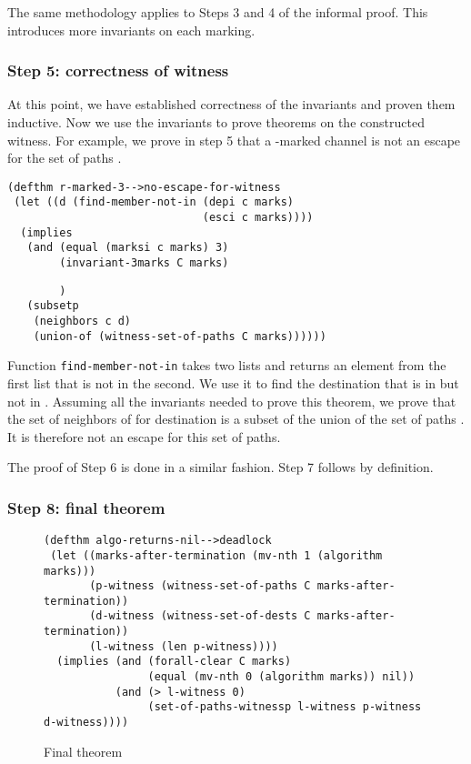 \documentclass[submission,copyright]{eptcs}
\begin{document}
The same methodology applies to Steps 3 and 4 of the informal proof. This introduces more invariants on each marking.

\subsubsection{Step 5: correctness of witness}
At this point, we have established correctness of the invariants and proven them inductive. Now we use the invariants to prove theorems on the constructed witness. For example, we prove in step 5 that a -marked channel is not an escape for the set of paths .
\begin{verbatim}
(defthm r-marked-3-->no-escape-for-witness
 (let ((d (find-member-not-in (depi c marks)
                              (esci c marks))))
  (implies
   (and (equal (marksi c marks) 3)
        (invariant-3marks C marks)
\end{verbatim}
\vspace{-1em}\hspace{10ex}\hspace{2ex}{\tt invariants}
\vspace{-1em}
\begin{verbatim}
        )
   (subsetp
    (neighbors c d)  
    (union-of (witness-set-of-paths C marks))))))
\end{verbatim}
Function {\tt find-member-not-in} takes two lists and returns an element from the first list that is not in the second. We use it to find the destination  that is in  but not in . Assuming all the invariants needed to prove this theorem, we prove that the set of neighbors of  for destination  is a subset of the union of the set of paths .
It is therefore not an escape for this set of paths.

The proof of Step 6 is done in a similar fashion. Step 7 follows by definition.

\subsubsection{Step 8: final theorem}
\begin{figure*}[ht]
\centering
\begin{minipage}{0.75\textwidth}
\begin{verbatim}
(defthm algo-returns-nil-->deadlock
 (let ((marks-after-termination (mv-nth 1 (algorithm marks)))
       (p-witness (witness-set-of-paths C marks-after-termination))
       (d-witness (witness-set-of-dests C marks-after-termination))
       (l-witness (len p-witness))))
  (implies (and (forall-clear C marks)
                (equal (mv-nth 0 (algorithm marks)) nil))
           (and (> l-witness 0)
                (set-of-paths-witnessp l-witness p-witness d-witness))))
\end{verbatim}
\end{minipage}
\caption{Final theorem}
\label{fig:finaltheorem}
\end{figure*}
\end{document}
